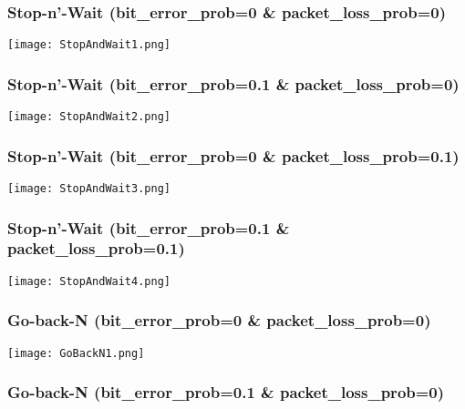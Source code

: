 \documentclass{article}
\begin{document}
\subsubsection{Stop-n'-Wait (bit\_error\_prob=0 \& packet\_loss\_prob=0)}

\begin{center}
    \texttt{[image: StopAndWait1.png]}
\end{center}

\subsubsection{Stop-n'-Wait (bit\_error\_prob=0.1 \& packet\_loss\_prob=0)}

\begin{center}
    \texttt{[image: StopAndWait2.png]}
\end{center}

\subsubsection{Stop-n'-Wait (bit\_error\_prob=0 \& packet\_loss\_prob=0.1)}

\begin{center}
    \texttt{[image: StopAndWait3.png]}
\end{center}

\subsubsection{Stop-n'-Wait (bit\_error\_prob=0.1 \& packet\_loss\_prob=0.1)}

\begin{center}
    \texttt{[image: StopAndWait4.png]}
\end{center}

\subsubsection{Go-back-N (bit\_error\_prob=0 \& packet\_loss\_prob=0)}

\begin{center}
    \texttt{[image: GoBackN1.png]}
\end{center}

\subsubsection{Go-back-N (bit\_error\_prob=0.1 \& packet\_loss\_prob=0)}
\end{document}
